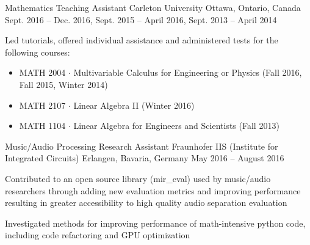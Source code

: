 

\begin{cventries}

    \cventry
      {Mathematics Teaching Assistant} %
      {Carleton University} %
      {Ottawa, Ontario, Canada} %
      {Sept. 2016 – Dec. 2016, Sept. 2015 – April 2016, Sept. 2013 – April 2014} %
      {
        \begin{cvitems} %
          \item {Led tutorials, offered individual assistance and administered tests for the following courses:}
            \begin{itemize}
              \item {MATH 2004 $\cdot$ Multivariable Calculus for Engineering or Physics (Fall 2016, Fall 2015, Winter 2014)}
              \item {MATH 2107 $\cdot$ Linear Algebra II (Winter 2016)}
              \item {MATH 1104 $\cdot$ Linear Algebra for Engineers and Scientists (Fall 2013)}
            \end{itemize}
        \end{cvitems}
      }

  \cventry
    {Music/Audio Processing Research Assistant} %
    {Fraunhofer IIS (Institute for Integrated Circuits)} %
    {Erlangen, Bavaria, Germany} %
    {May 2016 – August 2016} %
    {
      \begin{cvitems} %
        \item {Contributed to an open source library (mir\_eval) used by music/audio researchers through adding new evaluation metrics and improving performance resulting in greater accessibility to high quality audio separation evaluation}
        \item {Investigated methods for improving performance of math-intensive python code, including code refactoring and GPU optimization}
      \end{cvitems}
    }


\end{cventries}
